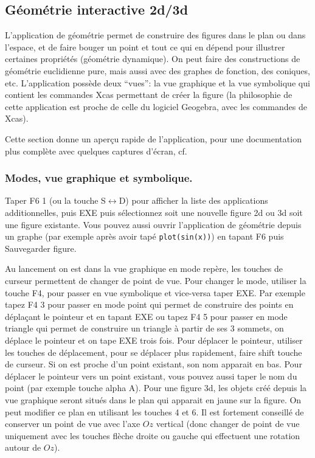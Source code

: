 \documentclass{article}
\begin{document}
\begin{giacjshere}
\subsection{G\'eom\'etrie interactive 2d/3d}
L'application de géométrie
permet de construire des figures dans le plan ou dans l'espace,
et de faire bouger un point et tout ce qui en d\'epend pour illustrer
certaines propriétés (géométrie
dynamique). On peut faire des constructions de géométrie euclidienne
pure, mais aussi avec des graphes de fonction, des coniques, etc.
L'application possède deux ``vues'': la vue graphique et la vue
symbolique qui contient les commandes Xcas permettant de créer la figure
(la philosophie de cette application est proche de celle du logiciel
Geogebra, avec les commandes de Xcas).

Cette section donne un aper\c{c}u rapide de l'application,
pour une documentation plus compl\`ete avec quelques captures d'\'ecran, cf.

\subsubsection{Modes, vue graphique et symbolique.}
Taper F6 1 (ou la touche S$\leftrightarrow$D) pour afficher la liste des
applications additionnelles, puis EXE puis sélectionnez soit une nouvelle
figure 2d ou 3d soit une figure existante. Vous pouvez aussi ouvrir
l'application de géométrie depuis un graphe (par exemple après avoir
tapé \verb|plot(sin(x))|) en tapant F6 puis Sauvegarder figure.

Au lancement on est dans la vue graphique en mode repère, les touches de curseur
permettent de changer de point de vue. Pour changer le mode, utiliser
la touche F4, pour passer en vue symbolique et vice-versa taper EXE.
Par exemple tapez F4 3 pour passer en mode point
qui permet de construire des points en déplaçant
le pointeur et en tapant EXE ou tapez F4 5 pour passer
en mode triangle qui permet de construire
un triangle à partir de ses 3 sommets, on déplace le pointeur et on tape EXE
trois fois. Pour déplacer le pointeur, utiliser les touches de déplacement,
pour se déplacer plus rapidement, faire shift touche de curseur. Si on
est proche d'un point existant, son nom apparait en bas. Pour
déplacer le pointeur vers un point existant, vous pouvez aussi
taper le nom du point (par exemple touche alpha A).
Pour une figure 3d, les objets créé depuis la vue graphique seront situés
dans le plan qui apparait en jaune sur la figure. On peut modifier ce plan
en utilisant les touches 4 et 6. Il est fortement conseillé de
conserver un point de vue avec l'axe $Oz$ vertical (donc changer
de point de vue uniquement avec les touches flèche droite ou gauche
qui effectuent une rotation autour de $Oz$).


\end{giacjshere}
\end{document}
